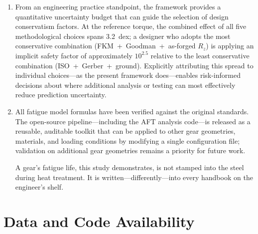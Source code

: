 \documentclass[12pt,a4paper]{article}
\begin{document}
\begin{enumerate}
        through defensible engineering workflows, can be reported as
        failing at $3.3\times10^2$ cycles or surviving beyond $10^6$---depending on
        which standard, mean-stress correction, and roughness
        assumption the engineer selects.
  \item From an engineering practice standpoint, the framework provides
        a quantitative uncertainty budget that can guide the selection
        of design conservatism factors. At the reference torque, the
        combined effect of all five methodological choices spans
        3.2~dex; a designer who adopts the most conservative combination
        (FKM~+~Goodman~+~as-forged $R_z$) is applying an implicit
        safety factor of approximately $10^{2.5}$ relative to the least
        conservative combination (ISO~+~Gerber~+~ground). Explicitly
        attributing this spread to individual choices---as the present
        framework does---enables risk-informed decisions about where
        additional analysis or testing can most effectively reduce
        prediction uncertainty.
  \item All fatigue model formulas have been verified against the
        original standards. The open-source pipeline---including
        the AFT analysis code---is released as a reusable, auditable
        toolkit that can be applied to other gear geometries, materials,
        and loading conditions by modifying a single configuration file; validation on
        additional gear geometries remains a priority for future work.

\medskip
\noindent A gear's fatigue life, this study demonstrates, is not stamped
into the steel during heat treatment. It is written---differently---into
every handbook on the engineer's shelf.
\end{enumerate}

\section*{Data and Code Availability}
\end{document}
